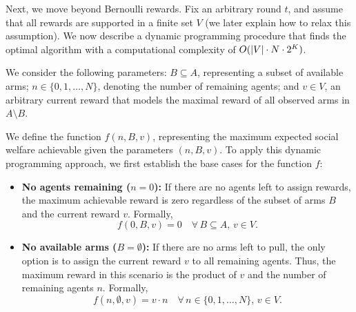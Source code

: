 

Next, we move beyond Bernoulli rewards. Fix an arbitrary round $t$, and assume that all rewards are supported in a finite set $V$ (we later explain how to relax this assumption). We now describe a dynamic programming procedure that finds the optimal algorithm with a computational complexity of $O(\left\lvert V\right\rvert \cdot N \cdot 2^K)$. 

We consider the following parameters: $B \subseteq A$, representing a subset of available arms; $n \in \{0,1,\dots,N\}$, denoting the number of remaining agents; and $v \in V$, an arbitrary current reward that models the maximal reward of all observed arms in $A \setminus B$.


We define the function $f(n, B, v)$, representing the maximum expected social welfare achievable given the parameters $(n,B,v)$. To apply this dynamic programming approach, we first establish the base cases for the function $f$:
\begin{itemize}
    \item \textbf{No agents remaining ($n = 0$):} If there are no agents left to assign rewards, the maximum achievable reward is zero regardless of the subset of arms $B$ and the current reward $v$. Formally, 
    \[
    f(0, B, v) = 0 \quad \forall \, B \subseteq A, \, v \in V.
    \]
    
    \item \textbf{No available arms ($B = \emptyset$):} If there are no arms left to pull, the only option is to assign the current reward $v$ to all remaining agents. Thus, the maximum reward in this scenario is the product of $v$ and the number of remaining agents $n$. Formally, 
    \[
    f(n, \emptyset, v) = v \cdot n \quad \forall \, n \in \{0,1,\dots,N\}, \, v \in V.
    \]
\end{itemize}

